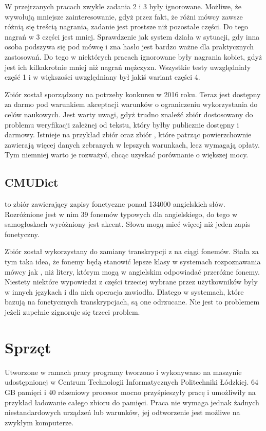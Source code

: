 W przejrzanych pracach zwykle zadania 2 i 3 były ignorowane. Możliwe, że wywołują mniejsze zainteresowanie,
gdyż przez fakt, że różni mówcy zawsze różnią się treścią nagrania, zadanie jest prostsze niż pozostałe części.
Do tego nagrań w 3 części jest mniej.
Sprawdzenie jak system działa w sytuacji, gdy inna osoba podszywa się pod mówcę i zna hasło jest bardzo
ważne dla praktycznych zastosowań.  Do tego w niektórych pracach ignorowane
były nagrania kobiet, gdyż jest ich kilkakrotnie mniej niż nagrań mężczyzn.
Wszystkie testy uwzględniały część 1 i w większości uwzględniany był jakiś wariant części 4.

Zbiór został sporządzony na potrzeby konkursu w 2016 roku. Teraz jest dostępny za darmo pod warunkiem
akceptacji warunków o ograniczeniu wykorzystania do celów naukowych. Jest warty uwagi, gdyż trudno znaleźć
zbiór dostosowany do problemu weryfikacji zależnej od tekstu, który byłby publicznie dostępny i darmowy.
Istnieje na przykład zbiór  oraz zbiór , które patrząc powierzchownie
zawierają więcej danych zebranych w lepszych warunkach, lecz wymagają opłaty. Tym niemniej warto
je rozważyć, chcąc uzyskać porównanie o większej mocy.

\subsection{CMUDict}

 to zbiór zawierający zapisy fonetyczne ponad 134000 angielskich słów. Rozróżnione
jest w nim 39 fonemów typowych dla angielskiego, do tego w samogłoskach wyróżniony jest akcent.
Słowa mogą mieć więcej niż jeden zapis fonetyczny.

Zbiór został wykorzystany do zamiany transkrypcji z  na ciągi fonemów. Stała
za tym taka idea, że fonemy będą stanowić lepsze klasy w systemach rozpoznawania mówcy jak
, niż litery, którym mogą w angielskim odpowiadać przeróżne fonemy.
Niestety niektóre wypowiedzi z części trzeciej wybrane przez użytkowników były w innych językach
i dla nich operacja zawiodła. Dlatego w systemach, które bazują na fonetycznych transkrypcjach,
są one odrzucane. Nie jest to problemem jeżeli zupełnie zignoruje się trzeci problem.

\section{Sprzęt}\label{sec:sprzet}

Utworzone w ramach pracy programy tworzono i wykonywano na maszynie udostępnionej
w Centrum Technologii Informatycznych Politechniki Łódzkiej. $64$GB pamięci i $40$ rdzeniowy
procesor mocno przyśpieszyły pracę i umożliwiły na przykład ładowanie całego zbioru do pamięci.
Praca nie wymaga jednak żadnych niestandardowych urządzeń lub warunków, jej odtworzenie
jest możliwe na zwykłym komputerze.

